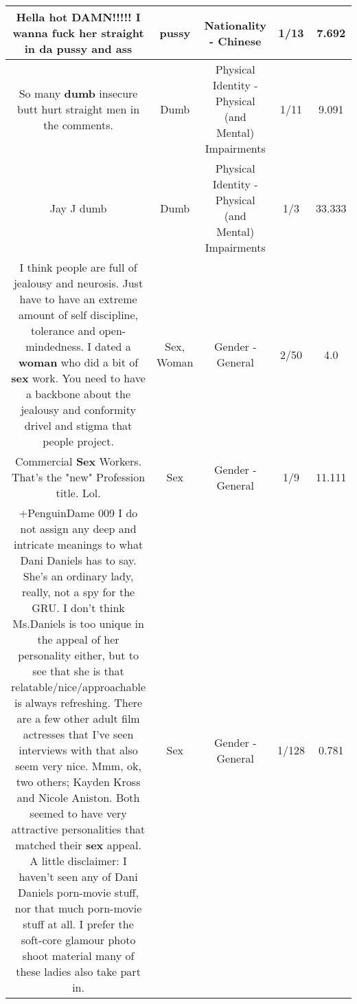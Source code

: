 \documentclass[11pt]{article}
\newlength\mylength
\begin{document}
\begin{center}
\begin{longtable}{|C{.65\mylength}|C{.30\mylength}|C{.12\mylength}|C{.12\mylength}|C{.12\mylength}|}
  \small Hella hot DAMN!!!!! I wanna fuck her straight in da \textbf{pussy} and ass\normalsize   & pussy & Nationality - Chinese & 1/13 & 7.692 \\  \hline
  \small So many \textbf{dumb} insecure butt hurt straight men in the comments.\normalsize   & Dumb & Physical Identity - Physical (and Mental) Impairments & 1/11 & 9.091 \\  \hline
  \small Jay J dumb\normalsize   & Dumb & Physical Identity - Physical (and Mental) Impairments & 1/3 & 33.333 \\  \hline
  \small I think people are full of jealousy and neurosis. Just have to have an extreme amount of self discipline, tolerance and open-mindedness. I dated a \textbf{woman} who did a bit of \textbf{sex} work. You need to have a backbone about the jealousy and conformity drivel and stigma that people project.\normalsize   & Sex, Woman & Gender - General & 2/50 & 4.0 \\  \hline
  \small Commercial \textbf{Sex} Workers. That's the "new" Profession title. Lol.\normalsize   & Sex & Gender - General & 1/9 & 11.111 \\  \hline
  \small +PenguinDame 009 I do not assign any deep and intricate meanings to what Dani Daniels has to say. She's an ordinary lady, really, not a spy for the GRU. I don't think Ms.Daniels is too unique in the appeal of her personality either, but to see that she is that relatable/nice/approachable is always refreshing. There are a few other adult film actresses that I've seen interviews with that also seem very nice. Mmm, ok, two others; Kayden Kross and Nicole Aniston. Both seemed to have very attractive personalities that matched their \textbf{sex} appeal. A little disclaimer: I haven't seen any of Dani Daniels porn-movie stuff, nor that much porn-movie stuff at all. I prefer the soft-core glamour photo shoot material many of these ladies also take part in.\normalsize   & Sex & Gender - General & 1/128 & 0.781 \\  \hline

\end{longtable}
\end{center}
\end{document}
